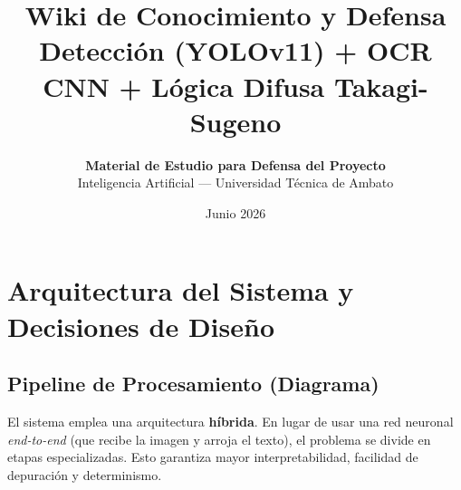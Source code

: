 \documentclass[11pt,a4paper]{article}
\title{\textbf{\Huge Wiki de Conocimiento y Defensa}\\
\vspace{0.5cm}
\Large Detecci\'on (YOLOv11) + OCR CNN + L\'ogica Difusa Takagi-Sugeno}
\author{\textbf{Material de Estudio para Defensa del Proyecto} \\ Inteligencia Artificial --- Universidad T\'ecnica de Ambato}
\date{Junio 2026}
\begin{document}
\maketitle
\tableofcontents
\newpage

\section{Arquitectura del Sistema y Decisiones de Dise\~no}

\subsection{Pipeline de Procesamiento (Diagrama)}

El sistema emplea una arquitectura \textbf{h\'ibrida}. En lugar de usar una red neuronal \emph{end-to-end} (que recibe la imagen y arroja el texto), el problema se divide en etapas especializadas. Esto garantiza mayor interpretabilidad, facilidad de depuraci\'on y determinismo.
\end{document}
